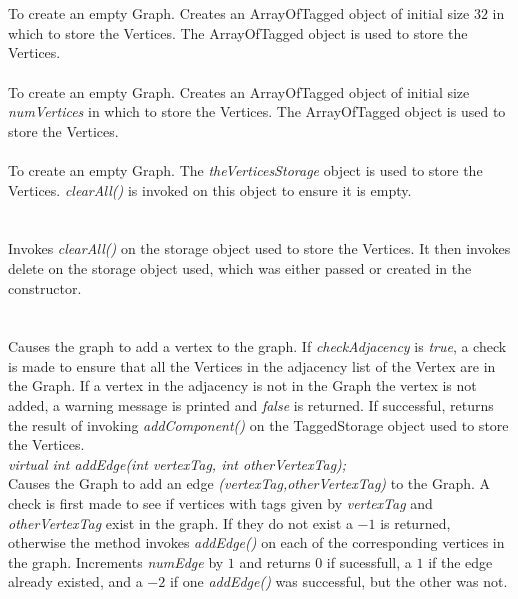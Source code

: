   \\
  \\
To create an empty Graph. Creates an ArrayOfTagged object of initial
size $32$ in which to store the Vertices. The ArrayOfTagged object is
used to store the Vertices.\\

 \\
To create an empty Graph. Creates an ArrayOfTagged object of initial
size {\em numVertices} in which to store the Vertices. The
ArrayOfTagged object is used to store the Vertices. \\ 

\\ 
To create an empty Graph. The {\em theVerticesStorage} object is used to
store the Vertices. {\em clearAll()} is invoked on this object to
ensure it is empty. \\

  \\
  \\
Invokes {\em clearAll()} on the storage object used to store the
Vertices. It then invokes delete on the storage object used, which was
either passed or created in the constructor. \\

  \\
 \\
Causes the graph to add a vertex to the graph. If {\em checkAdjacency}
is {\em true}, a check is made to ensure that all the Vertices in the
adjacency list of the Vertex are in the Graph. If a vertex in the
adjacency is not in the Graph the vertex is not added, a warning
message is printed and {\em false} is returned. If successful,
returns the result of invoking {\em addComponent()} on the
TaggedStorage object used to store the Vertices. \\



{\em virtual int addEdge(int vertexTag, int otherVertexTag); } \\
Causes the Graph to add an edge {\em (vertexTag,otherVertexTag)} to
the Graph. A check is first made to see if vertices with tags given by
{\em vertexTag} and {\em otherVertexTag} exist in the graph. If they
do not exist a $-1$ is returned, otherwise the method invokes {\em
addEdge()} on each of the corresponding vertices in the 
graph. Increments {\em numEdge} by $1$ and returns $0$ if sucessfull,
a $1$ if the edge already existed, and a $-2$ if one {\em addEdge()}
was successful, but the other was not.\\  

